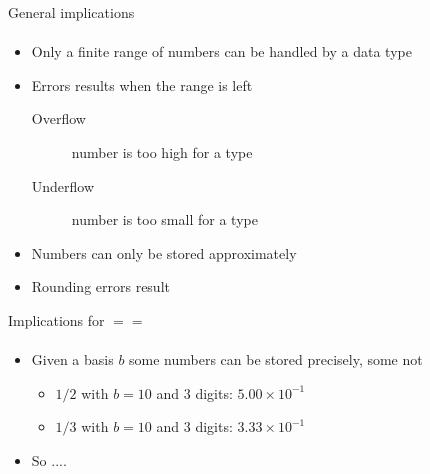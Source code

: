 \documentclass[presentation]{beamer}
\begin{document}
\begin{frame}{General implications}
\framesubtitle{}

\begin{itemize}
\item Only a finite range of numbers can be handled by a data type
\item Errors results when the range is left
  \begin{description}
  \item[Overflow] number is too high for a type
  \item[Underflow] number is too small for a type
  \end{description}
\item Numbers can only be stored approximately
\item Rounding errors result 
\end{itemize}

\end{frame}

\begin{frame}{Implications for $==$}
\framesubtitle{}

\begin{itemize}
\item Given a basis $b$ some numbers can be stored precisely, some not
  \begin{itemize}
  \item $1/2$ with $b=10$ and $3$ digits: $5.00 \times 10^{-1}$
  \item $1/3$ with $b=10$ and $3$ digits: $3.33 \times 10^{-1}$
  \end{itemize}
\item So ....

\end{itemize}


\end{frame}
\end{document}
